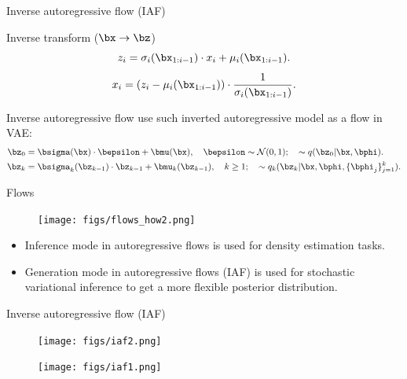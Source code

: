 \begin{frame}{Inverse autoregressive flow (IAF)}
	
	\begin{block}{Inverse transform ($\bx \rightarrow \bz$)}
		\vspace{-0.2cm}
		\[
			z_i = \sigma_i (\bx_{1:i-1}) \cdot x_i + \mu_i(\bx_{1:i-1}).
		\]
		\[
			x_i = \left( z_i - \mu_i(\bx_{1:i-1})\right) \cdot \frac{1}{\sigma_i (\bx_{1:i-1})}.
		\]
		\vspace{-0.3cm}
	\end{block}
	Inverse autoregressive flow use such inverted autoregressive model as a flow in VAE:
	\begin{align*}
		\bz_0 &= \bsigma(\bx) \cdot \bepsilon + \bmu(\bx), \quad \bepsilon \sim \mathcal{N}(0, 1); \quad  \sim q(\bz_0 | \bx, \bphi). \\
		\bz_k &= \bsigma_k(\bz_{k - 1}) \cdot \bz_{k-1} + \bmu_k(\bz_{k - 1}), \quad k \geq 1; \quad  \sim q_k(\bz_k | \bx, \bphi, \{\bphi_j\}_{j=1}^k).
	\end{align*}
\end{frame}
\begin{frame}{Flows}
	\begin{figure}
		\texttt{[image: figs/flows\_how2.png]}
	\end{figure}
	\begin{itemize}	
		\item Inference mode in autoregressive flows is used for density estimation tasks.
		\item Generation mode in autoregressive flows (IAF) is used for stochastic variational inference to get a more flexible posterior distribution.
	\end{itemize}

\end{frame}
\begin{frame}{Inverse autoregressive flow (IAF)}
	\begin{figure}
		\texttt{[image: figs/iaf2.png]}
	\end{figure}
	\begin{figure}
		\texttt{[image: figs/iaf1.png]}
	\end{figure}

\end{frame}
